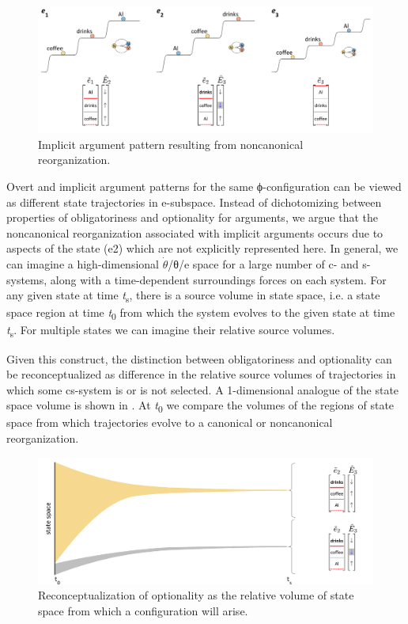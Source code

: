   
\begin{figure}
\includegraphics[width=\textwidth]{figures/Tilsen-img87.png}
\caption{Implicit argument pattern resulting from noncanonical reorganization.}
\label{fig:4:37}
\end{figure}
 

  Overt and implicit argument patterns for the same ϕ-configuration can be viewed as different state trajectories in e-subspace. Instead of dichotomizing between properties of obligatoriness and optionality for arguments, we argue that the noncanonical reorganization associated with implicit arguments occurs due to aspects of the state (e2) which are not explicitly represented here. In general, we can imagine a high-dimensional $\dot{\theta}$/θ/e space for a large number of c- and s-systems, along with a time-dependent surroundings forces on each system. For any given state at time \textit{t}\textsubscript{s}, there is a source volume in state space, i.e. a state space region at time \textit{t}\textsubscript{0} from which the system evolves to the given state at time \textit{t}\textsubscript{s}. For multiple states we can imagine their relative source volumes. 

  Given this construct, the distinction between obligatoriness and optionality can be reconceptualized as difference in the relative source volumes of trajectories in which some cs-system is or is not selected. A 1-dimensional analogue of the state space volume is shown in {}. At \textit{t}\textsubscript{0} we compare the volumes of the regions of state space from which trajectories evolve to a canonical or noncanonical reorganization.

  
\begin{figure}
\includegraphics[width=\textwidth]{figures/Tilsen-img88.png}
\caption{Reconceptualization of optionality as the relative volume of state space from which a configuration will arise.}
\label{fig:4:38}
\end{figure}
 

